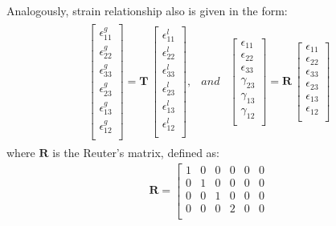\documentclass[materials,article,submit,moreauthors,pdftex]{Definitions/mdpi}
\begin{document}
{Analogously, strain relationship also is given in the form:
\begin{eqnarray}
\begin{array}{ccc}
\left [
\begin{array}{c}
\epsilon^g_{11}\\
\epsilon^g_{22}\\ 
\epsilon^g_{33}\\ 
\epsilon^g_{23}\\
\epsilon^g_{13}\\
\epsilon^g_{12}\\
\end{array}
\right ]=
\textbf{T}\,\left [
\begin{array}{c}
\epsilon^l_{11}\\
\epsilon^l_{22}\\ 
\epsilon^l_{33}\\
\epsilon^l_{23}\\
\epsilon^l_{13}\\
\epsilon^l_{12}\\
\end{array}
\right ], & and & \left [
\begin{array}{c}
\epsilon_{11}\\
\epsilon_{22}\\ 
\epsilon_{33}\\ 
\gamma_{23}\\
\gamma_{13}\\
\gamma_{12}\\
\end{array}
\right ]=
\textbf{R}\,\left [
\begin{array}{c}
\epsilon_{11}\\
\epsilon_{22}\\ 
\epsilon_{33}\\
\epsilon_{23}\\
\epsilon_{13}\\
\epsilon_{12}\\
\end{array}
\right ]
\end{array}
\label{eq:strain}
\end{eqnarray}
where \(\textbf{R}\) is the Reuter's matrix, defined as:
\begin{eqnarray}
\textbf{R} = \left [
\begin{array}{cccccc}
1 & 0 & 0 & 0 & 0 & 0\\
0 & 1 & 0 & 0 & 0 & 0\\
0 & 0  & 1 & 0 & 0 & 0\\
0 & 0 & 0 & 2 & 0 & 0\\

\end{array}
\end{eqnarray}}
\end{document}
